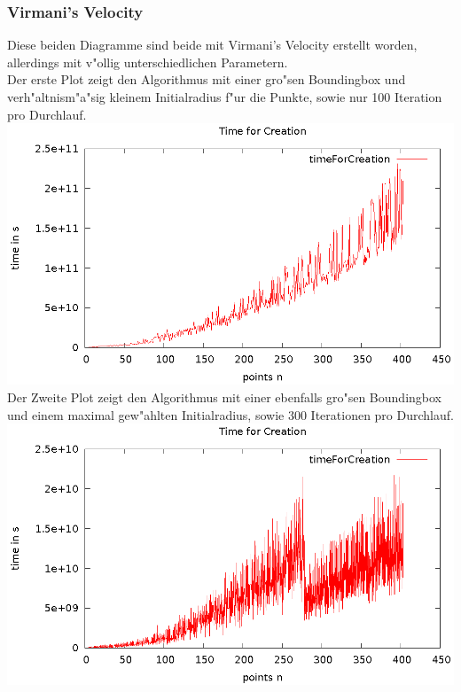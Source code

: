     \subsubsection{Virmani's Velocity}
      Diese beiden Diagramme sind beide mit Virmani's Velocity erstellt worden,
      allerdings mit v"ollig unterschiedlichen Parametern.\\
      Der erste Plot zeigt den Algorithmus mit einer gro"sen Boundingbox 
      und verh"altnism"a"sig kleinem Initialradius f"ur die Punkte, sowie 
      nur 100 Iteration pro Durchlauf.\\
      \includegraphics{img/velo_good_diagram_0.eps}\\
      Der Zweite Plot zeigt den Algorithmus mit einer ebenfalls gro"sen 
      Boundingbox und einem maximal gew"ahlten Initialradius, sowie 300 Iterationen
      pro Durchlauf.\\
      \includegraphics{img/velo_bad_diagram_0.eps}

